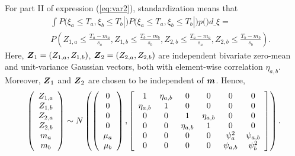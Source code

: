\documentclass[aoas]{imsart}
\begin{document}
For part II of expression (\ref{eq:var2}), standardization means that
\begin{eqnarray}\label{part1:phi4}
&& \int P(\xi_a \leq T_a, \xi_b \leq T_b|\bm) P(\xi_a \leq T_a, \xi_b \leq T_b|\bm) p(\bm) d\bm_{\xi}= \nonumber \\
&& P\left( Z_{1,a} \leq \frac{T_a-m_{a}}{s_{a}}, 
Z_{1,b} \leq \frac{T_b-m_{b}}{s_{b}},Z_{2,b} \leq \frac{T_a-m_{a}}{s_{a}}, 
Z_{2,b} \leq \frac{T_b-m_{b}}{s_{b}} \right). \nonumber
\end{eqnarray}
Here,
${\boldsymbol Z}_1=(Z_{1,a},Z_{1,b})$, ${\boldsymbol Z}_2=(Z_{2,a},Z_{2,b})$ are independent bivariate zero-mean and unit-variance Gaussian vectors, both with element-wise correlation
$\eta_{a,b}$. Moreover, ${\boldsymbol Z}_1$ and ${\boldsymbol Z}_2$ are chosen to be independent of ${\boldsymbol m}$. Hence,
\begin{equation}
    \left(
    \begin{array}{cccccc}
         Z_{1,a} \\
         Z_{1,b} \\
         Z_{2,a} \\
         Z_{2,b} \\
         m_{a} \\
         m_{b}
    \end{array}
    \right)
\sim N \left(
\left(
    \begin{array}{cccccc}
    0 \\
    0 \\
    0 \\
    0 \\
          \mu_{a} \\
         \mu_{b} 
    \end{array}
    \right),
   \left[ 
      \begin{array}{cccccc}
        1 & \eta_{a,b} & 0 & 0 & 0 & 0  \\
        \eta_{a,b} & 1 & 0 & 0 & 0 & 0 \\
        0 & 0 & 1 & \eta_{a,b} & 0 & 0 \\
        0 & 0 & \eta_{a,b} & 1 & 0 & 0 \\
        0 & 0 & 0 & 0 & \psi^2_{a} & \psi_{a,b} \\
        0 & 0 & 0 & 0 & \psi_{a,b} & \psi^2_{b} 
    \end{array}
\right]
\right).
\vspace{0.2cm}
\end{equation}
\end{document}
